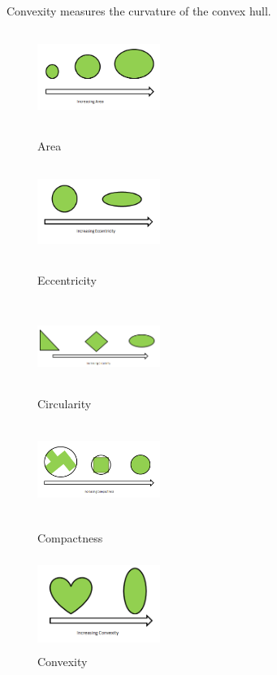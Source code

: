 \documentclass{article}
\begin{document}
~~~~~~Convexity measures the curvature of the convex hull.

\begin{figure}[!ht]
\begin{subfigure}{.5\textwidth}

\centering
        \includegraphics[width=40mm, height=30mm]{./Figures/c8.png}
        \caption{\label{areshape1}Area}

\centering
        \includegraphics[width=40mm, height=30mm]{./Figures/c9.png}
        \caption{\label{shape5}Eccentricity}

\centering
        \includegraphics[width=40mm, height=30mm]{./Figures/c6.png}
        \caption{\label{shape3}Circularity}
        
\end{subfigure} 
\begin{subfigure}{.5\textwidth}

\centering
        \includegraphics[width=40mm, height=30mm]{./Figures/c10.png}
        \caption{\label{shape4}Compactness}


\centering
        \includegraphics[width=40mm, height=30mm]{./Figures/c7.png}
        \caption{\label{shape7}Convexity}
        
\end{subfigure} 

\caption{}
        \end{figure}
\end{document}
